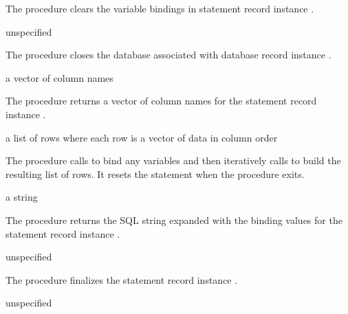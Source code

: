 The  procedure clears the variable
bindings in statement record instance .

\begin{procedure}
\end{procedure}
\returns{} unspecified

The  procedure closes the database associated with
database record instance .

\begin{procedure}
\end{procedure}
\returns{} a vector of column names

The  procedure returns a vector of column names
for the statement record instance .

\begin{procedure}
\end{procedure}
\returns{} a list of rows where each row is a vector of data in column order

The  procedure calls  to bind any variables and then
iteratively calls  to build the
resulting list of rows. It resets the statement when the procedure
exits.

\begin{procedure}
\end{procedure}
\returns{} a string

The  procedure returns the SQL string
expanded with the binding values for the statement record instance
.

\begin{procedure}
\end{procedure}
\returns{} unspecified

The  procedure finalizes the statement record
instance .

\begin{procedure}
\end{procedure}
\returns{} unspecified

